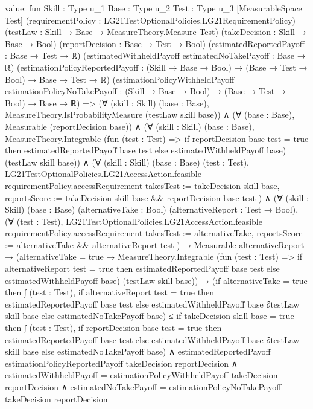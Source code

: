 \documentclass[10pt]{article}
\begin{document}
\begin{ReviewVerbatim}
value:
fun {Skill : Type u_1} {Base : Type u_2} {Test : Type u_3} [MeasurableSpace Test]
    (requirementPolicy : LG21TestOptionalPolicies.LG21RequirementPolicy)
    (testLaw : Skill → Base → MeasureTheory.Measure Test) (takeDecision : Skill → Base → Bool)
    (reportDecision : Base → Test → Bool) (estimatedReportedPayoff : Base → Test → ℝ)
    (estimatedWithheldPayoff estimatedNoTakePayoff : Base → ℝ)
    (estimationPolicyReportedPayoff : (Skill → Base → Bool) → (Base → Test → Bool) → Base → Test → ℝ)
    (estimationPolicyWithheldPayoff estimationPolicyNoTakePayoff :
      (Skill → Base → Bool) → (Base → Test → Bool) → Base → ℝ) =>
  (∀ (skill : Skill) (base : Base), MeasureTheory.IsProbabilityMeasure (testLaw skill base)) ∧
    (∀ (base : Base), Measurable (reportDecision base)) ∧
      (∀ (skill : Skill) (base : Base),
          MeasureTheory.Integrable
            (fun (test : Test) =>
              if reportDecision base test = true then estimatedReportedPayoff base test
              else estimatedWithheldPayoff base)
            (testLaw skill base)) ∧
        (∀ (skill : Skill) (base : Base) (test : Test),
            LG21TestOptionalPolicies.LG21AccessAction.feasible requirementPolicy.accessRequirement
              { takesTest := takeDecision skill base,
                reportsScore := takeDecision skill base && reportDecision base test }) ∧
          (∀ (skill : Skill) (base : Base) (alternativeTake : Bool) (alternativeReport : Test → Bool),
              (∀ (test : Test),
                  LG21TestOptionalPolicies.LG21AccessAction.feasible requirementPolicy.accessRequirement
                    { takesTest := alternativeTake, reportsScore := alternativeTake && alternativeReport test }) →
                Measurable alternativeReport →
                  (alternativeTake = true →
                      MeasureTheory.Integrable
                        (fun (test : Test) =>
                          if alternativeReport test = true then estimatedReportedPayoff base test
                          else estimatedWithheldPayoff base)
                        (testLaw skill base)) →
                    (if alternativeTake = true then
                        ∫ (test : Test),
                          if alternativeReport test = true then estimatedReportedPayoff base test
                          else estimatedWithheldPayoff base ∂testLaw skill base
                      else estimatedNoTakePayoff base) ≤
                      if takeDecision skill base = true then
                        ∫ (test : Test),
                          if reportDecision base test = true then estimatedReportedPayoff base test
                          else estimatedWithheldPayoff base ∂testLaw skill base
                      else estimatedNoTakePayoff base) ∧
            estimatedReportedPayoff = estimationPolicyReportedPayoff takeDecision reportDecision ∧
              estimatedWithheldPayoff = estimationPolicyWithheldPayoff takeDecision reportDecision ∧
                estimatedNoTakePayoff = estimationPolicyNoTakePayoff takeDecision reportDecision
\end{ReviewVerbatim}
\end{document}
